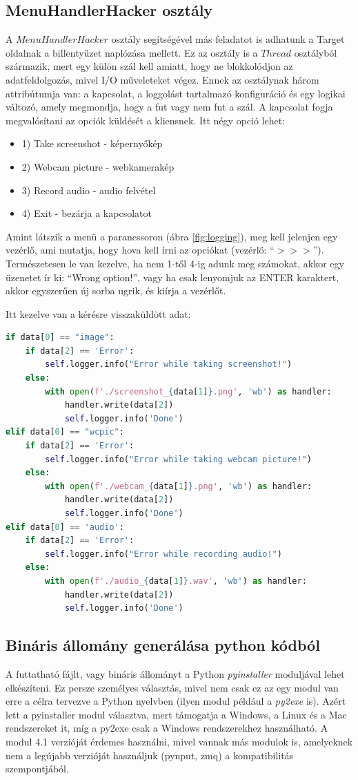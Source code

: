 \documentclass[12pt,a4paper,oneside]{report}
\begin{document}
\subsection{MenuHandlerHacker osztály}\label{subsubsec:menuhandler}
A $MenuHandlerHacker$ osztály segítségével más feladatot is adhatunk a Target oldalnak a billentyűzet naplózása mellett. Ez az osztály is a $Thread$ osztályból származik, mert egy külön szál kell amiatt, hogy ne blokkolódjon az adatfeldolgozás, mivel I/O műveleteket végez.  Ennek az osztálynak három attribútumja van: a kapcsolat, a loggolást tartalmazó konfiguráció és egy logikai változó, amely megmondja, hogy a fut vagy nem fut a szál. A kapcsolat fogja megvalósítani az opciók küldését a kliensnek. Itt négy opció lehet:
\begin{itemize}
\item 1) Take screenshot - képernyőkép
\item 2) Webcam picture - webkamerakép
\item 3) Record audio - audio felvétel
\item 4) Exit - bezárja a kapcsolatot
\end{itemize}

Amint látszik a menü a parancssoron (ábra \ref{fig:logging}), meg kell jelenjen egy vezérlő, ami mutatja, hogy hova kell írni az opciókat (vezérlő: ``$>>>$'').
Természetesen le van kezelve, ha nem 1-től 4-ig adunk meg számokat, akkor egy üzenetet ír ki: ``Wrong option!'', vagy ha csak lenyomjuk az ENTER karaktert, akkor egyszerűen új sorba ugrik, és kiírja a vezérlőt.

Itt kezelve van a kérésre visszaküldött adat:
\begin{lstlisting}[language=Python]
if data[0] == "image":
	if data[2] == 'Error':
		self.logger.info("Error while taking screenshot!")
	else:
		with open(f'./screenshot_{data[1]}.png', 'wb') as handler:
			handler.write(data[2])
			self.logger.info('Done')
elif data[0] == "wcpic":
	if data[2] == 'Error':
		self.logger.info("Error while taking webcam picture!")
	else:
		with open(f'./webcam_{data[1]}.png', 'wb') as handler:
			handler.write(data[2])
			self.logger.info('Done')
elif data[0] == 'audio':
	if data[2] == 'Error':
		self.logger.info("Error while recording audio!")
	else:
		with open(f'./audio_{data[1]}.wav', 'wb') as handler:
			handler.write(data[2])
			self.logger.info('Done')
\end{lstlisting}

\subsection{Bináris állomány generálása python kódból}
A futtatható fájlt, vagy bináris állományt a Python \textit{pyinstaller} moduljával lehet elkészíteni. Ez persze személyes választás, mivel nem csak ez az egy modul van erre a célra tervezve a Python nyelvben (ilyen modul például a \textit{py2exe} is). Azért lett a pyinstaller modul választva, mert támogatja a Windows, a Linux és a Mac rendszereket it, míg a py2exe csak a Windows rendszerekhez használható. A modul 4.1 verzióját érdemes használni, mivel vannak más modulok is, amelyeknek nem a legújabb verzióját használjuk (pynput, zmq) a kompatibilitás szempontjából.
\end{document}
